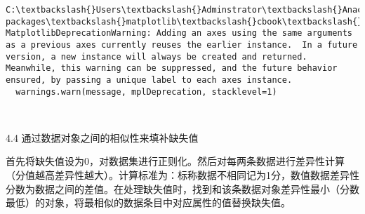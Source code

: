 \documentclass[11pt]{article}
\begin{document}
    \begin{Verbatim}[commandchars=\\\{\}]
C:\textbackslash{}Users\textbackslash{}Adminstrator\textbackslash{}Anaconda3\textbackslash{}lib\textbackslash{}site-packages\textbackslash{}matplotlib\textbackslash{}cbook\textbackslash{}deprecation.py:107: MatplotlibDeprecationWarning: Adding an axes using the same arguments as a previous axes currently reuses the earlier instance.  In a future version, a new instance will always be created and returned.  Meanwhile, this warning can be suppressed, and the future behavior ensured, by passing a unique label to each axes instance.
  warnings.warn(message, mplDeprecation, stacklevel=1)

    \end{Verbatim}

    \begin{center}
    \end{center}
    { \hspace*{\fill} \\}
    
    4.4 通过数据对象之间的相似性来填补缺失值

首先将缺失值设为0，对数据集进行正则化。然后对每两条数据进行差异性计算（分值越高差异性越大）。计算标准为：标称数据不相同记为1分，数值数据差异性分数为数据之间的差值。在处理缺失值时，找到和该条数据对象差异性最小（分数最低）的对象，将最相似的数据条目中对应属性的值替换缺失值。
\end{document}

